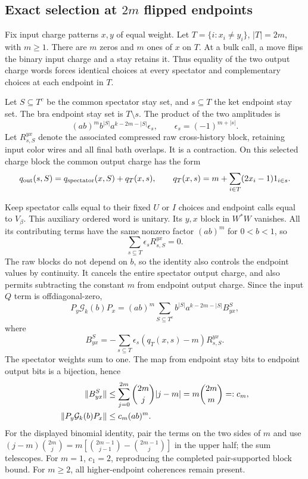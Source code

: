 \subsection{Exact selection at \texorpdfstring{$2m$}{2m} flipped endpoints}

Fix input charge patterns $x,y$ of equal weight. Let
$T=\{i:x_i\ne y_i\}$, $|T|=2m$, with $m\ge1$.
There are $m$ zeros and $m$ ones of $x$ on $T$.
At a bulk call, a move flips the binary input charge and a stay retains it.
Thus equality of the two output charge words forces identical choices
at every spectator and complementary choices at each endpoint in $T$.

Let $S\subseteq T^c$ be the common spectator stay set, and
$s\subseteq T$ the ket endpoint stay set. The bra endpoint stay set is
$T\setminus s$. The product of the two amplitudes is
\[
 (ab)^m b^{|S|}a^{k-2m-|S|}\epsilon_s,
 \qquad \epsilon_s=(-1)^{m+|s|}.
\]
Let $R_{s,S}^{yx}$ denote the associated compressed raw cross-history
block, retaining input color wires and all final bath overlaps.
It is a contraction. On this selected charge block the common output
charge has the form
\[
 q_{\rm out}(s,S)=q_{\rm spectator}(x,S)+q_T(x,s),
 \qquad
 q_T(x,s)=m+\sum_{i\in T}(2x_i-1)1_{i\in s}.
\]

Keep spectator calls equal to their fixed $U$ or $I$ choices and endpoint
calls equal to $V_\beta$. This auxiliary ordered word is unitary. Its
$y,x$ block in $W^*W$ vanishes. All its contributing terms have the
same nonzero factor $(ab)^m$ for $0<b<1$, so
\begin{equation}\label{eq:hammingunitarity}
 \sum_{s\subseteq T}\epsilon_sR_{s,S}^{yx}=0.
\end{equation}
The raw blocks do not depend on $b$, so the identity also controls the
endpoint values by continuity. It cancels the entire spectator output
charge, and also permits subtracting the constant $m$ from endpoint
output charge. Since the input $Q$ term is offdiagonal-zero,
\[
 P_y\mathcal G_k(b)P_x
 =(ab)^m\sum_{S\subseteq T^c}
       b^{|S|}a^{k-2m-|S|}B_{yx}^S,
\]
where
\[
 B_{yx}^S=-\sum_{s\subseteq T}
        \epsilon_s(q_T(x,s)-m)R_{s,S}^{yx}.
\]
The spectator weights sum to one. The map from endpoint stay bits to
endpoint output bits is a bijection, hence
\begin{align}
 \|B_{yx}^S\|
 &\le \sum_{j=0}^{2m}\binom{2m}{j}|j-m|
 =m\binom{2m}{m}=:c_m,\notag\\
 \|P_y\mathcal G_k(b)P_x\|&\le c_m(ab)^m.
 \label{eq:hammingblock}
\end{align}
For the displayed binomial identity, pair the terms on the two sides of
$m$ and use
$ (j-m)\binom{2m}{j}
=m[\binom{2m-1}{j-1}-\binom{2m-1}{j}]$
in the upper half; the sum telescopes.
For $m=1$, $c_1=2$, reproducing the completed pair-supported block bound.
For $m\ge2$, all higher-endpoint coherences remain present.

